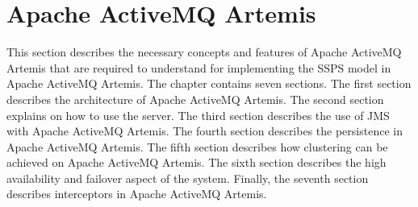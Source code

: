 \chapter{Apache ActiveMQ Artemis}\label{chapter:artemis}

This section describes the necessary concepts and features of Apache ActiveMQ Artemis that are required to understand for implementing the SSPS model in Apache ActiveMQ Artemis. The chapter contains seven sections. The first section describes the architecture of Apache ActiveMQ Artemis. The second section explains on how to use the server. The third section describes the use of JMS with Apache ActiveMQ Artemis. The fourth section describes the persistence in Apache ActiveMQ Artemis. The fifth section describes how clustering can be achieved on Apache ActiveMQ Artemis. The sixth section describes the high availability and failover aspect of the system. Finally, the seventh section describes interceptors in Apache ActiveMQ Artemis.